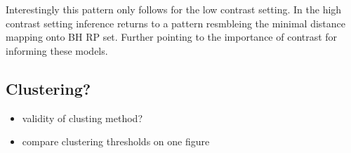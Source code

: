 %
Interestingly this pattern only follows for the low contrast setting. In the high 
contrast setting inference returns to a pattern resmbleing the minimal distance 
mapping onto BH RP set. Further pointing to the importance of contrast for informing
these models.



%

%

\subsection{Clustering?}
%
\begin{itemize}
\item validity of clusting method?
\item compare clustering thresholds on one figure
\end{itemize}

